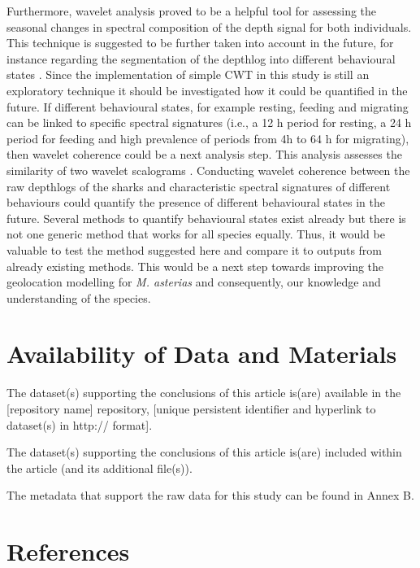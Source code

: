 \documentclass[
  authoryear,
  review,
  3p]{elsarticle}
\begin{document}
Furthermore, wavelet analysis proved to be a helpful tool for assessing
the seasonal changes in spectral composition of the depth signal for
both individuals. This technique is suggested to be further taken into
account in the future, for instance regarding the segmentation of the
depthlog into different behavioural states \citep[as already shown
by][]{soleymani_2017}. Since the implementation of simple CWT in this
study is still an exploratory technique it should be investigated how it
could be quantified in the future. If different behavioural states, for
example resting, feeding and migrating can be linked to specific
spectral signatures (i.e., a 12 h period for resting, a 24 h period for
feeding and high prevalence of periods from 4h to 64 h for migrating),
then wavelet coherence could be a next analysis step. This analysis
assesses the similarity of two wavelet scalograms \citep{grinsted_2004}.
Conducting wavelet coherence between the raw depthlogs of the sharks and
characteristic spectral signatures of different behaviours could
quantify the presence of different behavioural states in the future.
Several methods to quantify behavioural states exist already
\citep{pedersen_2008, heerah_2017} but there is not one generic method
that works for all species equally. Thus, it would be valuable to test
the method suggested here and compare it to outputs from already
existing methods. This would be a next step towards improving the
geolocation modelling for \emph{M. asterias} and consequently, our
knowledge and understanding of the species.

\hypertarget{availability-of-data-and-materials}{%
\section*{Availability of Data and
Materials}\label{availability-of-data-and-materials}}

The dataset(s) supporting the conclusions of this article is(are)
available in the {[}repository name{]} repository, {[}unique persistent
identifier and hyperlink to dataset(s) in http:// format{]}.

The dataset(s) supporting the conclusions of this article is(are)
included within the article (and its additional file(s)).

The metadata that support the raw data for this study can be found in
Annex B.

\hypertarget{references}{%
\section*{References}\label{references}}
\end{document}
